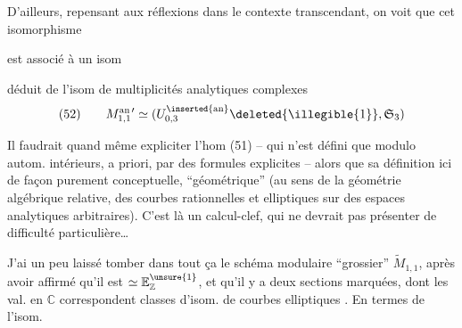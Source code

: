 D'ailleurs, repensant aux réflexions dans le
contexte transcendant, on voit que
cet isomorphisme


est associé à un isom


déduit de l'isom de multiplicités analytiques
complexes
\[
(52)\qquad M_{1,1}^{\mathrm{an}\,\prime}\simeq
(U_{0,3}^{\inserted{\mathrm{an}}}\deleted{\illegible{1}},\mathfrak S_3)
\]

Il faudrait quand même expliciter
l'hom (51) -- qui n'est défini que
modulo autom. intérieurs, a priori,
par des formules explicites -- alors que
sa définition ici  de façon purement conceptuelle, ``géométrique'' (au sens
de la géométrie algébrique relative, des
courbes rationnelles et elliptiques sur des
espaces analytiques arbitraires). C'est là
un calcul-clef,  qui ne devrait pas
présenter de difficulté particulière\ldots


J'ai un peu laissé tomber  dans tout
ça le schéma modulaire ``grossier'' $\widetilde M_{1,1}$,
après avoir affirmé qu'il est $\simeq\mathbb E_{\mathbb Z}^{\unsure{1}}$, et
qu'il y a deux sections marquées,
dont les  val. en $\mathbb C$\unsure{,} correspondent
  classes d'isom. de courbes elliptiques
. En termes de l'isom.
